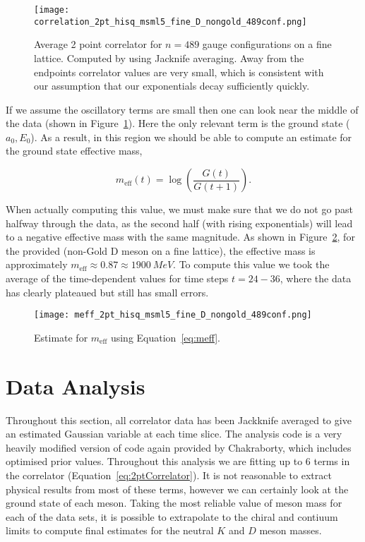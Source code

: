 \documentclass[a4paper,12pt]{article}
\begin{document}
\begin{figure}[!h]
    \centering
    \texttt{[image: correlation\_2pt\_hisq\_msml5\_fine\_D\_nongold\_489conf.png]}
    \caption{Average 2 point correlator for $n=489$ gauge configurations on a fine lattice. Computed by using Jacknife averaging. Away from the endpoints correlator values are very small, which is consistent with our assumption that our exponentials decay sufficiently quickly.\label{fig:2ptCorrelator}}
\end{figure}

If we assume the oscillatory terms are small then one can look near the middle of the data (shown in Figure~\ref{fig:2ptCorrelator}). Here the only relevant term is the ground state ($a_0, E_0$). As a result, in this region we should be able to compute an estimate for the ground state effective mass, 

\begin{equation}
    \label{eq:meff}
    m_{\text{eff}}(t) = \log(\frac{G(t)}{G(t+1)}).
\end{equation}

When actually computing this value, we must make sure that we do not go past halfway through the data, as the second half (with rising exponentials) will lead to a negative effective mass with the same magnitude. As shown in Figure~\ref{fig:2ptCorrelatorMeff}, for the provided (non-Gold D meson on a fine lattice), the effective mass is approximately $m_\text{eff} \approx 0.87 \approx \SI{1900}{MeV}$. To compute this value we took the average of the time-dependent values for time steps $t = 24 - 36$, where the data has clearly plateaued but still has small errors.

\begin{figure}[!h]
    \centering
    \texttt{[image: meff\_2pt\_hisq\_msml5\_fine\_D\_nongold\_489conf.png]}
    \caption{Estimate for $m_\text{eff}$ using Equation~\ref{eq:meff}.\label{fig:2ptCorrelatorMeff}} 
\end{figure}

\clearpage
\section{Data Analysis}
Throughout this section, all correlator data has been Jackknife averaged to give an estimated Gaussian variable at each time slice. The analysis code is a very heavily modified version of code again provided by Chakraborty, which includes optimised prior values. Throughout this analysis we are fitting up to 6 terms in the correlator (Equation~\ref{eq:2ptCorrelator}). It is not reasonable to extract physical results from most of these terms, however we can certainly look at the ground state of each meson. Taking the most reliable value of meson mass for each of the data sets, it is possible to extrapolate to the chiral and contiuum limits to compute final estimates for the neutral $K$ and $D$ meson masses.
\end{document}
